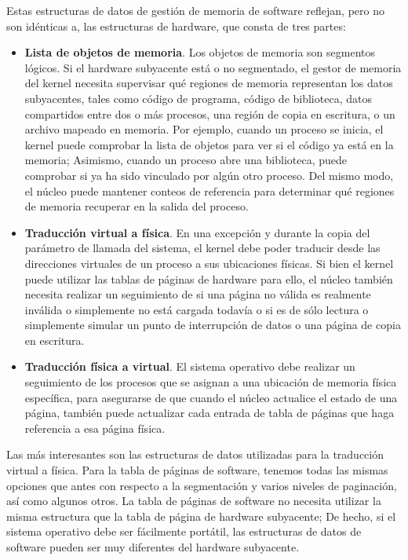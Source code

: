 \documentclass[10pt]{book}
\begin{document}
Estas estructuras de datos de gestión de memoria de software reflejan, pero no son idénticas a, las estructuras de hardware, que consta de tres partes:
\begin{itemize}
\item \textbf{Lista de objetos de memoria}. Los objetos de memoria son segmentos lógicos. Si el hardware subyacente está o no segmentado, el gestor de memoria del kernel necesita supervisar qué regiones de memoria representan los datos subyacentes, tales como código de programa, código de biblioteca, datos compartidos entre dos o más procesos, una región de copia en escritura, o un archivo mapeado en memoria. Por ejemplo, cuando un proceso se inicia, el kernel puede comprobar la lista de objetos para ver si el código ya está en la memoria; Asimismo, cuando un proceso abre una biblioteca, puede comprobar si ya ha sido vinculado por algún otro proceso. Del mismo modo, el núcleo puede mantener conteos de referencia para determinar qué regiones de memoria recuperar en la salida del proceso.

\item \textbf{Traducción virtual a física}. En una excepción y durante la copia del parámetro de llamada del sistema, el kernel debe poder traducir desde las direcciones virtuales de un proceso a sus ubicaciones físicas. Si bien el kernel puede utilizar las tablas de páginas de hardware para ello, el núcleo también necesita realizar un seguimiento de si una página no válida es realmente inválida o simplemente no está cargada todavía o si es de sólo lectura o simplemente simular un punto de interrupción de datos o una página de copia en escritura.

\item \textbf{Traducción física a virtual}. El sistema operativo debe realizar un seguimiento de los procesos que se asignan a una ubicación de memoria física específica, para asegurarse de que cuando el núcleo actualice el estado de una página, también puede actualizar cada entrada de tabla de páginas que haga referencia a esa página física.
\end{itemize}

Las más interesantes son las estructuras de datos utilizadas para la traducción virtual a física. Para la tabla de páginas de software, tenemos todas las mismas opciones que antes con respecto a la segmentación y varios niveles de paginación, así como algunos otros. La tabla de páginas de software no necesita utilizar la misma estructura que la tabla de página de hardware subyacente; De hecho, si el sistema operativo debe ser fácilmente portátil, las estructuras de datos de software pueden ser muy diferentes del hardware subyacente.
\end{document}
